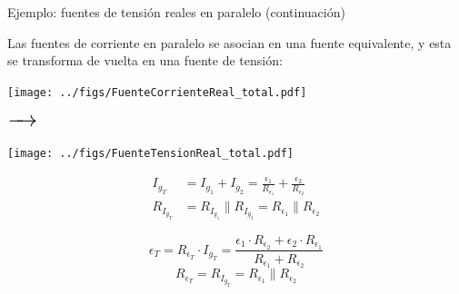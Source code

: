 \documentclass[aspectratio=169, xcolor={usenames,svgnames,dvipsnames}]{beamer}
\begin{document}
\begin{frame}{Ejemplo: \hspace{3mm}fuentes de tensión reales en paralelo \hspace{3mm}(continuación)}

    \vspace{2mm}
    Las fuentes de corriente en paralelo se asocian en una fuente equivalente, y esta se transforma de vuelta en una fuente de tensión:

    \begin{minipage}[c]{0.45\linewidth}
        \begin{center}
        \texttt{[image: ../figs/FuenteCorrienteReal\_total.pdf]}
        \end{center}
    \end{minipage}
    \begin{minipage}[c]{0.08\linewidth}        
        $\LARGE \xrightarrow{\hspace*{0.5cm}}$        
    \end{minipage}
    \begin{minipage}[c]{0.3\linewidth}
        \begin{center}
        \texttt{[image: ../figs/FuenteTensionReal\_total.pdf]}
        \end{center}
    \end{minipage}

    \vspace{-2mm}
    \begin{minipage}[c]{0.45\linewidth}
        \begin{center}
            \begin{align*}
            I_{g_T} &= I_{g_1} + I_{g_2} = \frac{\epsilon_1}{R_{\epsilon_1}} + \frac{\epsilon_2}{R_{\epsilon_2}} \\[2pt]
            R_{I_{g_T}} &= R_{I_{g_1}} \parallel R_{I_{g_2}} = R_{\epsilon_1} \parallel R_{\epsilon_2}
            \end{align*}
        \end{center}
    \end{minipage}
    \begin{minipage}[c]{0.08\linewidth}  
        \hfill
    \end{minipage}
    \begin{minipage}[c]{0.3\linewidth}
        \[
            \boxed{ \epsilon_T = R_{\epsilon_T} \cdot I_{g_T} =  \frac{\epsilon_1 \cdot R_{\epsilon_2} + \epsilon_2 \cdot R_{\epsilon_1}}{R_{\epsilon_1} + R_{\epsilon_2}}}
        \]
        \vspace{-3mm}
        \[
            \boxed{ R_{\epsilon_T} = R_{I_{g_T}} = R_{\epsilon_1} \parallel R_{\epsilon_2} }
        \]
    \end{minipage}
\end{frame}
\end{document}
